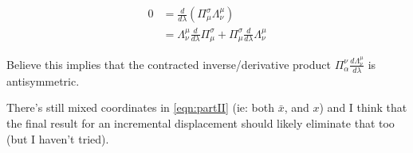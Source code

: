 \begin{align*}
0 
&= \frac{d}{d\lambda} \left( \Pi^\sigma_\mu \Lambda^\mu_\nu \right) \\
&= \Lambda^\mu_\nu \frac{d}{d\lambda} \Pi^\sigma_\mu + \Pi^\sigma_\mu \frac{d}{d\lambda} \Lambda^\mu_\nu 
\end{align*}

Believe this implies that the contracted inverse/derivative product $\Pi^\nu_\alpha \frac{d \Lambda^\mu_\nu}{d\lambda}$ is antisymmetric.

There's still mixed coordinates in \ref{eqn:partII} (ie: both $\bar{x}$, and $x$) and I think that the final result for an incremental displacement
should likely eliminate that too (but I haven't tried).

%

%
%

%
